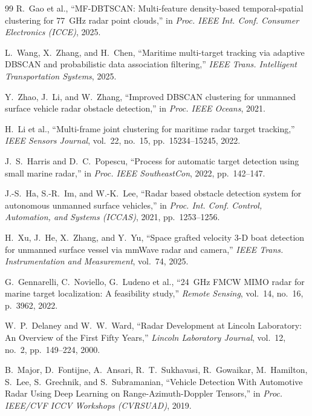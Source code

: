 \documentclass[conf]{new-aiaa}
\begin{document}
\begin{thebibliography}{99}
 R.~Gao et al., ``MF-DBTSCAN: Multi-feature density-based temporal-spatial clustering for 77~GHz radar point clouds,'' in \textit{Proc. IEEE Int. Conf. Consumer Electronics (ICCE)}, 2025.

 L.~Wang, X.~Zhang, and H.~Chen, ``Maritime multi-target tracking via adaptive DBSCAN and probabilistic data association filtering,'' \textit{IEEE Trans. Intelligent Transportation Systems}, 2025.

 Y.~Zhao, J.~Li, and W.~Zhang, ``Improved DBSCAN clustering for unmanned surface vehicle radar obstacle detection,'' in \textit{Proc. IEEE Oceans}, 2021.

 H.~Li et al., ``Multi-frame joint clustering for maritime radar target tracking,'' \textit{IEEE Sensors Journal}, vol.~22, no.~15, pp.~15234--15245, 2022.

 J.~S.~Harris and D.~C.~Popescu, ``Process for automatic target detection using small marine radar,'' in \textit{Proc. IEEE SoutheastCon}, 2022, pp.~142--147.

 J.-S.~Ha, S.-R.~Im, and W.-K.~Lee, ``Radar based obstacle detection system for autonomous unmanned surface vehicles,'' in \textit{Proc. Int. Conf. Control, Automation, and Systems (ICCAS)}, 2021, pp.~1253--1256.

 H.~Xu, J.~He, X.~Zhang, and Y.~Yu, ``Space grafted velocity 3-D boat detection for unmanned surface vessel via mmWave radar and camera,'' \textit{IEEE Trans. Instrumentation and Measurement}, vol.~74, 2025.

 G.~Gennarelli, C.~Noviello, G.~Ludeno et al., ``24~GHz FMCW MIMO radar for marine target localization: A feasibility study,'' \textit{Remote Sensing}, vol.~14, no.~16, p.~3962, 2022.

W.~P.~Delaney and W.~W.~Ward,
``Radar Development at Lincoln Laboratory: An Overview of the First Fifty Years,''
\textit{Lincoln Laboratory Journal}, vol.~12, no.~2, pp.~149--224, 2000.

B.~Major, D.~Fontijne, A.~Ansari, R.~T.~Sukhavasi, R.~Gowaikar, M.~Hamilton, S.~Lee, S.~Grechnik, and S.~Subramanian,
``Vehicle Detection With Automotive Radar Using Deep Learning on Range-Azimuth-Doppler Tensors,''
in \textit{Proc. IEEE/CVF ICCV Workshops (CVRSUAD)}, 2019.


\end{thebibliography}
\end{document}
